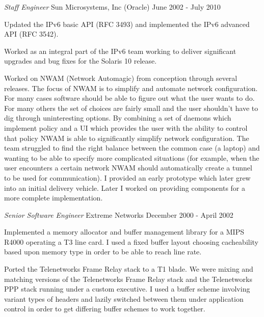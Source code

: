 \documentclass[margin]{res}
\begin{document}
\begin{resume}
                {\sl\large Staff Engineer} Sun Microsystems, Inc (Oracle) \hfill June 2002 - July 2010

                Updated the IPv6 basic API (RFC 3493) and implemented the IPv6 advanced API (RFC 3542).

                Worked as an integral part of the IPv6 team working
                to deliver significant upgrades and bug fixes for the
                Solaris 10 release.

                Worked on NWAM (Network Automagic) from conception
                through several releases. The focus of NWAM is to
                simplify and automate network configuration. For many
                cases software should be able to figure out what the
                user wants to do. For many others the set of choices are
                fairly small and the user shouldn't have to dig through
                uninteresting options. By combining a set of daemons
                which implement policy and a UI which provides the user
                with the ability to control that policy NWAM is able
                to significantly simplify network configuration. The
                team struggled to find the right balance between the
                common case (a laptop) and wanting to be able to specify
                more complicated situations (for example, when the user
                encounters a certain network NWAM should automatically
                create a tunnel to be used for communication). I
                provided an early prototype which later grew into an
                initial delivery vehicle. Later I worked on providing
                components for a more complete implementation.

                {\sl\large Senior Software Engineer} Extreme Networks \hfill December 2000 - April 2002

                Implemented a memory allocator and buffer management library for a MIPS
                R4000 operating a T3 line card. I used a fixed buffer layout choosing
                cacheability based upon memory type in order to be able to reach line
                rate.

                Ported the Telenetworks Frame Relay stack to a T1 blade. We were mixing
                and matching versions of the Telenetworks Frame Relay stack and the
                Telenetworks PPP stack running under a custom executive. I used a buffer
                scheme involving variant types of headers and lazily switched between
                them under application control in order to get differing buffer schemes
                to work together.


\end{resume}
\end{document}
